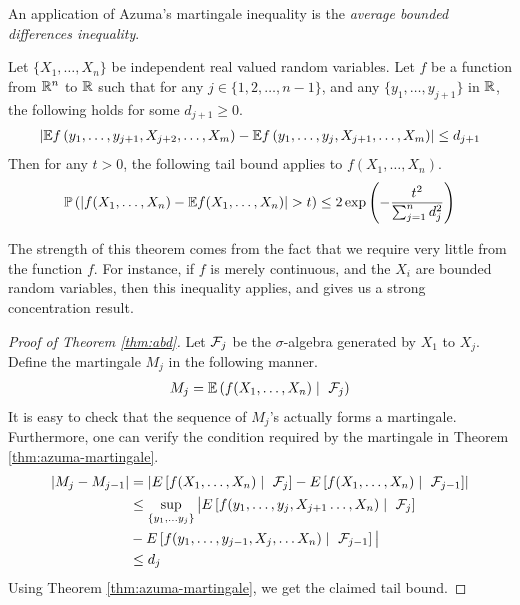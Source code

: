 \documentclass[11pt]{article}
\begin{document}
An application of Azuma's martingale inequality is the \emph{average bounded differences inequality}.

\begin{theorem}
  \label{thm:abd}
  Let $\{X_1, \ldots, X_n\}$ be independent real valued random variables.
  Let $f$ be a function from $\mathbb{R}^n$ to $\mathbb{R}$ such that for any $j \in \{1, 2, \ldots, n-1\}$, and any $\{y_1, \ldots, y_{j+1}\}$ in $\mathbb{R}$, the following holds for some $d_{j+1} \geq 0$.
  \begin{align*}
    \left| \mathbb{E} f\left( y_1, \ldots, y_{j+1}, X_{j+2}, \ldots, X_m \right) -
    \mathbb{E} f\left( y_1, \ldots, y_j, X_{j+1}, \ldots, X_m \right)
    \right| \leq d_{j+1}
  \end{align*}
  Then for any $t > 0$, the following tail bound applies to $f(X_1, \ldots, X_n)$.
  \begin{align*}
    \mathbb{P}\left( \left| f(X_1, \ldots, X_n) - \mathbb{E} f(X_1, \ldots, X_n) \right| > t \right)
    \leq 2 \exp\left( - \frac{t^2}{\sum_{j=1}^n d_j^2} \right)
  \end{align*}
\end{theorem}

\begin{remark}
  The strength of this theorem comes from the fact that we require very little from the function $f$.
  For instance, if $f$ is merely continuous, and the $X_i$ are bounded random variables, then this inequality applies, and gives us a strong concentration result.
\end{remark}

\begin{proof}[Proof of Theorem \ref{thm:abd}]
  Let $\mathcal{F}_j$ be the $\sigma$-algebra generated by $X_1$ to $X_j$.
  Define the martingale $M_j$ in the following manner.
  \begin{align*}
    M_j = \mathbb{E}\left( f(X_1, \ldots, X_n) \mid\ \mathcal{F}_j \right)
  \end{align*}
  It is easy to check that the sequence of $M_j$'s actually forms a martingale.
  Furthermore, one can verify the condition required by the martingale in Theorem \ref{thm:azuma-martingale}.
  \begin{align*}
    \left| M_j - M_{j-1} \right|
    &= \left| E\left[ f(X_1, \ldots, X_n) \mid\ \cF_j \right] - E\left[ f(X_1, \ldots, X_n) \mid\ \cF_{j-1} \right] \right| \\
    &\leq \sup_{\left\{ y_1, \ldots y_j \right\}} \big| E\left[ f(y_1, \ldots, y_j, X_{j+1} \ldots, X_n) \mid\ \cF_j \right] \\
    &- E\left[ f(y_1, \ldots, y_{j-1}, X_j, \ldots X_n) \mid\ \cF_{j-1} \right] \big| \\
    &\leq d_j
  \end{align*}
  Using Theorem \ref{thm:azuma-martingale}, we get the claimed tail bound.
\end{proof}

\printbibliography
\end{document}
